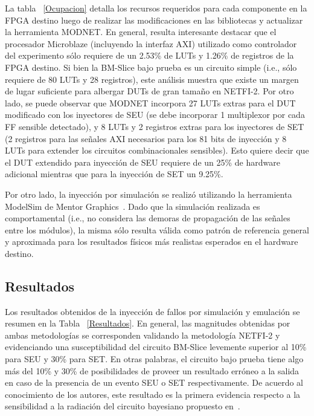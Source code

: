 \documentclass[a4paper,openright,12pt]{report}
\begin{document}
La tabla ~\ref{Ocupacion} detalla los recursos requeridos para cada componente en la FPGA destino luego de realizar las modificaciones en las bibliotecas y actualizar la herramienta MODNET. En general, resulta interesante destacar que el procesador Microblaze (incluyendo la interfaz AXI) utilizado como controlador del experimento sólo requiere de un 2.53\% de LUTs y 1.26\% de registros de la FPGA destino. Si bien la BM-Slice bajo prueba es un circuito simple (i.e., sólo requiere de 80 LUTs y 28 registros), este análisis muestra que existe un margen de lugar suficiente para albergar DUTs de gran tamaño en NETFI-2. Por otro lado, se puede observar que MODNET incorpora 27 LUTs extras para el DUT modificado con los inyectores de SEU (se debe incorporar 1 multiplexor por cada FF sensible detectado), y 8 LUTs y 2 registros extras para los inyectores de SET (2 registros para las señales AXI necesarios para los 81 bits de inyección y 8 LUTs para extender los circuitos combinacionales sensibles). Esto quiere decir que el DUT extendido para inyección de SEU requiere de un 25\% de hardware adicional mientras que para la inyección de SET un 9.25\%.

Por otro lado, la inyección por simulación se realizó utilizando la herramienta ModelSim de Mentor Graphics~\cite{modelsim}. Dado que la simulación realizada es comportamental (i.e., no considera las demoras de propagación de las señales entre los módulos), la misma sólo resulta válida como patrón de referencia general y aproximada para los resultados físicos más realistas esperados en el hardware destino.

\subsection{Resultados}

Los resultados obtenidos de la inyección de fallos por simulación y emulación se resumen en la Tabla ~\ref{Resultados}. En general, las magnitudes obtenidas por ambas metodologías se corresponden validando la metodología NETFI-2 y evidenciando una susceptibilidad del circuito BM-Slice levemente superior al 10\% para SEU y 30\% para SET. En otras palabras, el circuito bajo prueba tiene algo más del 10\% y 30\% de posibilidades de proveer un resultado erróneo a la salida en caso de la presencia de un evento SEU o SET respectivamente. De acuerdo al conocimiento de los autores, este resultado es la primera evidencia respecto a la sensibilidad a la radiación del circuito bayesiano propuesto en~\cite{Duarte2015}.
\end{document}
